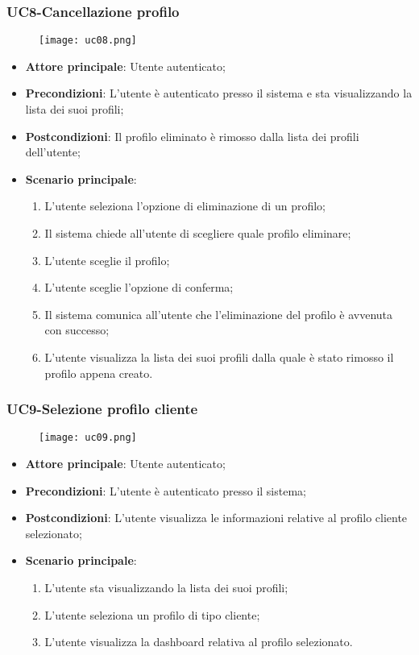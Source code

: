 \pagebreak
\subsubsection{UC8-Cancellazione profilo}
\begin{figure}[h] \texttt{[image: uc08.png]} \end{figure}

\begin{itemize}
\item \textbf{Attore principale}: Utente autenticato;
\item \textbf{Precondizioni}: L'utente è autenticato presso il sistema e sta visualizzando la lista dei suoi profili;
\item \textbf{Postcondizioni}: Il profilo eliminato è rimosso dalla lista dei profili dell'utente;
\item \textbf{Scenario principale}:
\begin{enumerate}
\item L'utente seleziona l'opzione di eliminazione di un profilo;
\item Il sistema chiede all'utente di scegliere quale profilo eliminare;
\item L'utente sceglie il profilo;
\item L'utente sceglie l'opzione di conferma;
\item Il sistema comunica all'utente che l'eliminazione del profilo è avvenuta con successo;
\item L'utente visualizza la lista dei suoi profili dalla quale è stato rimosso il profilo appena creato.
\end{enumerate}
\end{itemize}

\subsubsection{UC9-Selezione profilo cliente}
\begin{figure}[h] \texttt{[image: uc09.png]} \end{figure}

\begin{itemize}
\item \textbf{Attore principale}: Utente autenticato;
\item \textbf{Precondizioni}: L'utente è autenticato presso il sistema;
\item \textbf{Postcondizioni}: L'utente visualizza le informazioni relative al profilo cliente selezionato;
\item \textbf{Scenario principale}:
\begin{enumerate}
\item L'utente sta visualizzando la lista dei suoi profili;
\item L'utente seleziona un profilo di tipo cliente;
\item L'utente visualizza la dashboard relativa al profilo selezionato.
\end{enumerate}
\end{itemize}

